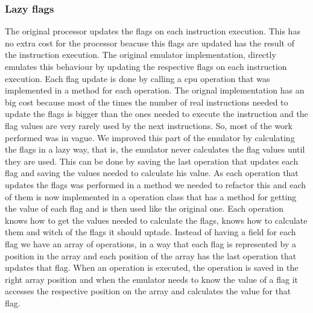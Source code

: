 \subsubsection{Lazy flags}
The original processor updates the flags on each instruction execution. This has no extra cost for the processor beacuse this flags are updated has the result of the instruction execution. The original emulator implementation, directly emulates this behaviour by updating the respective flags on each instruction execution. Each flag update is done by calling a cpu operation that was implemented in a method for each operation.
The orignal implementation has an big cost because most of the times the number of real instructions needed to update the flags is bigger than the ones needed to execute the instruction and the flag values are very rarely used by the next instructions. So, most of the work performed was in vague.
We improved this part of the emulator by calculating the flags in a lazy way, that is, the emulator never calculates the flag values until they are used. This can be done by saving the last operation that updates each flag and saving the values needed to calculate his value.
As each operation that updates the flags was performed in a method we needed to refactor this and each of them is now implemented in a operation class that has a method for getting the value of each flag and is then used like the original one. Each operation knows how to get the values needed to calculate the flags, knows how to calculate them and witch of the flags it should uptade.
Instead of having a field for each flag we have an array of operations, in a way that each flag is represented by a position in the array and each position of the array has the last operation that updates that flag. When an operation is executed, the operation is saved in the right array position and when the emulator needs to know the value of a flag it accesses the respective position on the array and calculates the value for that flag.

